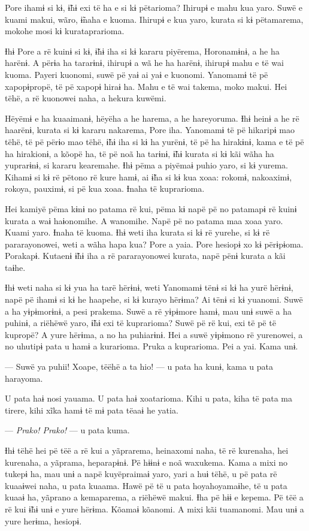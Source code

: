 Pore ihamɨ si kɨ, ɨ̃hɨ exi të ha e si kɨ pëtarioma? Ihirupɨ e mahu kua
 yaro. Suwë e kuami makui, wãro, ɨ̃naha e kuoma. Ihirupɨ e kua yaro,
 kurata si kɨ pëtamarema, mokohe mosi kɨ kurataprarioma.

Ɨhɨ Pore a rë kuinɨ si kɨ, ɨ̃hɨ iha si kɨ kararu piyërema, Horonamɨnɨ, a
he ha harënɨ. A përɨa ha tararɨnɨ, ihirupɨ a wã he ha harënɨ, ihirupɨ
mahu e të wai kuoma. Payeri kuonomi, suwë pë yaɨ ai yaɨ e kuonomi.
Yanomamɨ të pë xapopɨpropë, të pë xapopɨ hiraɨ ha. Mahu e të wai takema,
moko makui. Hei tëhë, a rë kuonowei naha, a hekura kuwëmi. 

Hëyëmɨ e ha kuaaimanɨ, hëyëha a he harema, a he hareyoruma. Ɨhɨ heinɨ a
he rë haarënɨ, kurata si kɨ kararu nakarema, Pore iha. Yanomamɨ të pë
hikaripɨ mao tëhë, të pë përɨo mao tëhë, ɨ̃hɨ iha si kɨ ha yurënɨ, të pë
ha hirakɨnɨ, kama e të pë ha hirakionɨ, a kõopë ha, të pë noã ha tarɨnɨ,
ɨ̃hɨ kurata si kɨ kãi wãha ha yuprarɨnɨ, si kararu kearemahe. Ɨhɨ pëma a
piyëmaɨ puhio yaro, si kɨ yurema. Kihamɨ si kɨ rë pëtono rë kure hamɨ,
ai ɨ̃ha si kɨ kua xoaa: rokomɨ, nakoaximɨ, rokoya, pauximɨ, si pë kua
xoaa. Ɨnaha të kuprarioma. 

Hei kamiyë pëma kɨnɨ no patama rë kui, pëma kɨ napë pë no patamapɨ rë
 kuinɨ kurata a waɨ haɨonomihe. A wanomihe. Napë pë no patama maa xoaa
 yaro. Kuami yaro. Ɨnaha të kuoma. Ɨhɨ weti iha kurata si kɨ rë yurehe,
 si kɨ rë pararayonowei, weti a wãha hapa kua? Pore a yaia. Pore hesiopɨ
 xo kɨ përɨpɨoma. Porakapɨ. Kutaenɨ ɨ̃hɨ iha a rë pararayonowei kurata,
 napë pënɨ kurata a kãi taɨhe.

Ɨhɨ weti naha si kɨ yua ha tarë hërɨnɨ, weti Yanomamɨ tënɨ si kɨ ha yurë
hërɨnɨ, napë pë ihamɨ si kɨ he haapehe, si kɨ kurayo hërɨma? Ai tënɨ si
kɨ yuanomi. Suwë a ha yɨpɨmorɨnɨ, a pesi prakema. Suwë a rë yɨpɨmore
hamɨ, mau unɨ suwë a ha puhinɨ, a riëhëwë yaro, ɨ̃hɨ exi të kuprarioma?
Suwë pë rë kui, exi të pë të kupropë? A yure hërɨma, a no ha puhiarɨnɨ.
Hei a suwë yɨpɨmono rë yurenowei, a no uhutipɨ pata u hamɨ a kurarioma.
Pruka a kuprarioma. Pei a yai. Kama unɨ. 

--- Suwë ya puhii! Xoape, tëëhë a ta hio! --- u pata ha kunɨ, kama u pata
harayoma. 

U pata haɨ nosi yauama. U pata haɨ xoatarioma. Kihi u pata, kiha të pata
ma tirere, kihi xĩka hamɨ të mɨ pata tëaaɨ he yatia. 

--- \textit{Prako! Prako!} --- u pata kuma. 

Ɨhɨ tëhë hei pë tëë a rë kui a yãprarema, heinaxomi naha, të rë
kurenaha, hei kurenaha, a yãprama, heparapɨnɨ. Pë hɨɨnɨ e noã waxukema.
Kama a mixi no tukepɨ ha, mau unɨ a napë kuyëpraimaɨ yaro, yari a huɨ
tëhë, u pë pata rë kuaaɨwei naha, u pata kuaama. Hawë pë të u pata
hoyahoyamaɨhe, të u pata kuaaɨ ha, yãprano a kemaparema, a riëhëwë
makui. Ɨha pë hɨɨ e kepema. Pë tëë a rë kui ɨ̃hɨ unɨ e yure hërɨma.
Kõamaɨ kõanomi. A mixi kãi tuamanomi. Mau unɨ a yure herɨma, hesiopɨ. 

